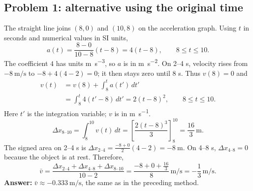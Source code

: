 \ifphysicsshowsolutions\clearpage\fi
\begin{solution}
\subsection*{Problem 1: alternative using the original time}
The straight line joins $(8,0)$ and $(10,8)$ on the acceleration graph.
Using $t$ in seconds and numerical values in SI units,
\[
a(t)=\frac{8-0}{10-8}(t-8)=4(t-8),\qquad 8\leq t\leq10.
\]
The coefficient $4$ has units \unit{\metre\per\second\cubed},
so $a$ is in \unit{\metre\per\second\squared}.
On 2--4 s, velocity rises from $-\qty{8}{\metre\per\second}$ to
$-8+4(4-2)=0$; it then stays zero until 8 s. Thus $v(8)=0$ and
\[
\begin{aligned}
v(t)&=v(8)+\int_8^t a(t')\,dt'\\
    &=\int_8^t4(t'-8)\,dt'=2(t-8)^2,\qquad 8\leq t\leq10.
\end{aligned}
\]
Here $t'$ is the integration variable; $v$ is in \unit{\metre\per\second}.
\[
\Delta x_{8\text{--}10}=\int_8^{10}v(t)\,dt
=\left[\frac{2(t-8)^3}{3}\right]_8^{10}
=\frac{16}{3}\,\unit{\metre}.
\]
The signed area on 2--4 s is
$\Delta x_{2\text{--}4}=\frac{-8+0}{2}(4-2)=-\qty{8}{\metre}$.
On 4--8 s, $\Delta x_{4\text{--}8}=0$ because the object is at rest.
Therefore,
\[
\bar v=\frac{\Delta x_{2\text{--}4}+\Delta x_{4\text{--}8}
+\Delta x_{8\text{--}10}}{10-2}
=\frac{-8+0+\frac{16}{3}}{8}\,\unit{\metre\per\second}
=-\frac{1}{3}\,\unit{\metre\per\second}.
\]
\textbf{Answer:} $\bar v\approx-\qty{0.333}{\metre\per\second}$,
the same as in the preceding method.
\end{solution}


